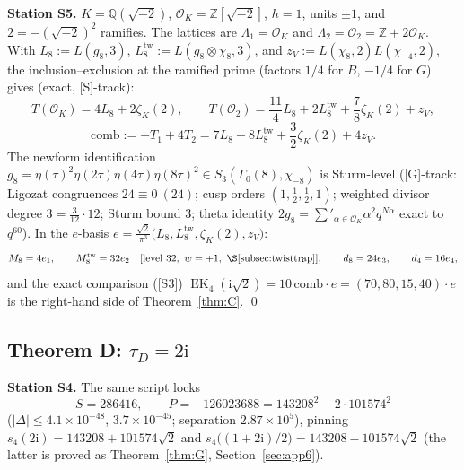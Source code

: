 \documentclass[11pt]{article}
\newcommand{\Qq}{\mathbb{Q}}
\newcommand{\Zz}{\mathbb{Z}}
\newcommand{\ii}{\mathrm{i}}
\newcommand{\OO}{\mathcal{O}}
\DeclareMathOperator{\EK}{EK}
\theoremstyle{definition}
\theoremstyle{remark}
\begin{document}
\textbf{Station S5.} $K=\Qq(\sqrt{-2})$, $\OO_K=\Zz[\sqrt{-2}]$,
$h=1$, units $\pm1$, and $2=-(\sqrt{-2})^2$ ramifies. The lattices
are $\Lambda_1=\OO_K$ and $\Lambda_2=\OO_2=\Zz+2\OO_K$. With
$L_8:=L(g_8,3)$, $L_8^{\mathrm{tw}}:=L(g_8\otimes\chi_8,3)$, and
$z_V:=L(\chi_8,2)L(\chi_{-4},2)$, the inclusion--exclusion at the
ramified prime (factors $1/4$ for $B$, $-1/4$ for $G$) gives (exact,
[S]-track):
\[
  T(\OO_K)=4L_8+2\zeta_K(2),\qquad
  T(\OO_2)=\frac{11}{4}L_8+2L_8^{\mathrm{tw}}+\frac78\zeta_K(2)+z_V,
\]
\[
  \mathrm{comb}:=-T_1+4T_2
  =7L_8+8L_8^{\mathrm{tw}}+\frac32\zeta_K(2)+4z_V .
\]
The newform identification
$g_8=\eta(\tau)^2\eta(2\tau)\eta(4\tau)\eta(8\tau)^2
\in S_3(\Gamma_0(8),\chi_{-8})$ is Sturm-level
([G]-track: Ligozat congruences $24\equiv0\ (24)$; cusp orders
$(1,\tfrac12,\tfrac12,1)$; weighted divisor degree
$3=\frac{3}{12}\cdot12$; Sturm bound $3$; theta identity
$2g_8=\sum'_{\alpha\in\OO_K}\alpha^2q^{N\alpha}$ exact to $q^{60}$).
In the $e$-basis
$e=\frac{\sqrt2}{\pi^3}\bigl(L_8,L_8^{\mathrm{tw}},\zeta_K(2),z_V\bigr)$:
\[
  M_8=4e_1,\qquad M_8^{\mathrm{tw}}=32e_2\quad
  [\text{level }32,\ w=+1,\ \S\ref{subsec:twisttrap}],\qquad
  d_8=24e_3,\qquad d_4=16e_4,
\]
and the exact comparison ([S3])
$\EK_4(\ii\sqrt2)=10\,\mathrm{comb}\cdot e=(70,80,15,40)\cdot e$
is the right-hand side of Theorem~\ref{thm:C}. \qed

\subsection{Theorem D: \texorpdfstring{$\tau_D=2\ii$}{tauD}}
\label{subsec:app3D}

\textbf{Station S4.} The same script locks
\[
  S=286416,\qquad P=-126023688=143208^2-2\cdot101574^2
\]
($|\Delta|\le4.1\times10^{-48}$, $3.7\times10^{-45}$; separation
$2.87\times10^{5}$), pinning
$s_4(2\ii)=143208+101574\sqrt2$ and
$s_4\bigl((1+2\ii)/2\bigr)=143208-101574\sqrt2$ (the latter is
proved as Theorem~\ref{thm:G}, Section~\ref{sec:app6}).
\end{document}
